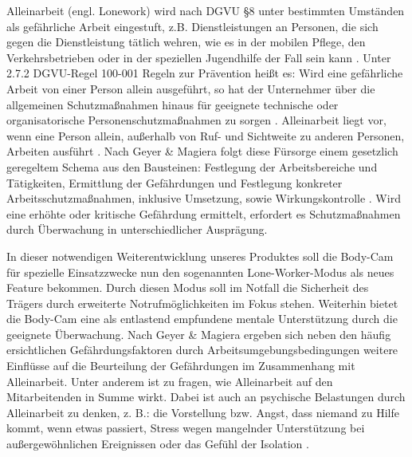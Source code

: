 \documentclass[thesis.tex]{subfiles}
\begin{document}
Alleinarbeit (engl. Lonework) wird nach DGVU §8 unter bestimmten Umständen als gefährliche Arbeit eingestuft, z.B. Dienstleistungen an Personen, die sich gegen die Dienstleistung tätlich wehren, wie es in der mobilen Pflege, den Verkehrsbetrieben oder in der speziellen Jugendhilfe der Fall sein kann \cite[§8]{Vorschrift1_DGUV}.
Unter 2.7.2 DGVU-Regel 100-001 \glqq Regeln zur Prävention\grqq{} heißt es: \glqq Wird eine gefährliche Arbeit von einer Person allein ausgeführt, so hat der Unternehmer über die allgemeinen Schutzmaßnahmen hinaus für geeignete technische oder organisatorische Personenschutzmaßnahmen zu sorgen\grqq{} \cite[§8(2)]{Vorschrift1_DGUV}.
\glqq Alleinarbeit liegt vor, wenn eine Person allein, außerhalb von Ruf- und Sichtweite zu anderen Personen, Arbeiten ausführt\grqq{} \cite[S.42]{Regel_100-001}.
Nach Geyer \& Magiera folgt diese Fürsorge einem gesetzlich geregeltem Schema aus den Bausteinen: Festlegung der Arbeitsbereiche und Tätigkeiten, Ermittlung der Gefährdungen und Festlegung konkreter Arbeitsschutzmaßnahmen, inklusive Umsetzung, sowie Wirkungskontrolle \cite[vgl. S.42 ff.]{GeyerMagiera2022}.
Wird eine erhöhte oder kritische Gefährdung ermittelt, erfordert es Schutzmaßnahmen durch Überwachung in unterschiedlicher Ausprägung.

In dieser notwendigen Weiterentwicklung unseres Produktes soll die Body-Cam für spezielle Einsatzzwecke nun den sogenannten Lone-Worker-Modus als neues Feature bekommen.
Durch diesen Modus soll im Notfall die Sicherheit des Trägers durch erweiterte Notrufmöglichkeiten im Fokus stehen.
Weiterhin bietet die Body-Cam eine als entlastend empfundene mentale Unterstützung durch die geeignete Überwachung.
Nach Geyer \& Magiera ergeben sich \glqq neben den häufig ersichtlichen Gefährdungsfaktoren durch Arbeitsumgebungsbedingungen weitere Einflüsse auf die Beurteilung der Gefährdungen im Zusammenhang mit Alleinarbeit.
Unter anderem ist zu fragen, wie Alleinarbeit auf den Mitarbeitenden in Summe wirkt.
Dabei ist auch an psychische Belastungen durch Alleinarbeit zu denken, z. B.: die Vorstellung bzw. Angst, dass niemand zu Hilfe kommt, wenn etwas passiert, Stress wegen mangelnder Unterstützung bei außergewöhnlichen Ereignissen oder das Gefühl der Isolation \cite[vgl. S.45]{GeyerMagiera2022}.
\end{document}
